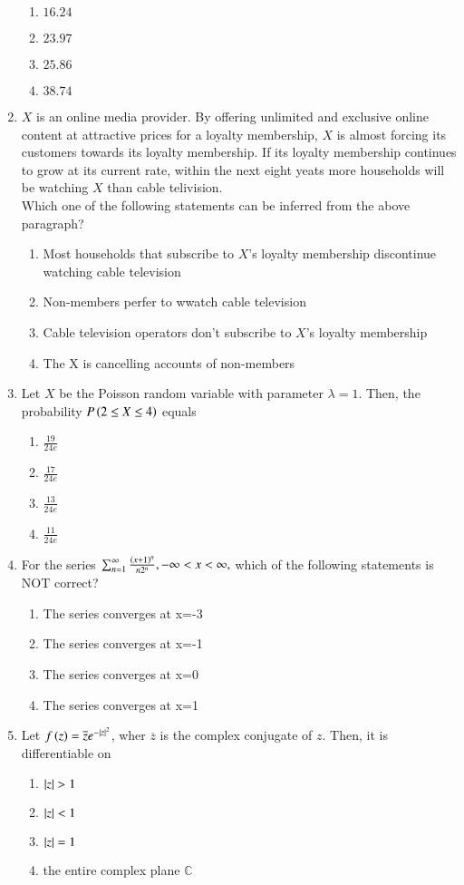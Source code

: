 \documentclass[journal,12pt,onecolumn]{IEEEtran}
\theoremstyle{remark}
\begin{document}
\begin{enumerate}
\begin{enumerate}
	\item $16.24$
	\item $23.97$
	\item $25.86$
	\item $38.74$
\end{enumerate}
\item $X$ is an online media provider. By offering unlimited and exclusive online content at attractive prices for a loyalty membership, $X$ is almost forcing its customers towards its loyalty membership. If its loyalty membership continues to grow at its current rate, within the next eight yeats more households will be watching $X$ than cable telivision.\\ Which one of the following statements can be inferred from the above paragraph?
	\begin{enumerate}
		\item Most households that subscribe to $X$'s loyalty membership discontinue watching cable television
		\item Non-members perfer to wwatch cable television
		\item Cable television operators don't subscribe to $X$'s loyalty membership
		\item The X is cancelling accounts of non-members
	\end{enumerate}
\item Let $X$ be the Poisson random variable with parameter $\lambda=1$. Then, the probability $P\left(2\leq X\leq 4\right)$ equals
	\begin{enumerate}
		\item $\frac{19}{24e}$
		\item $\frac{17}{24e}$
		\item $\frac{13}{24e}$
		\item $\frac{11}{24e}$
\end{enumerate}
\item For the series $\sum_{n=1}^{\infty}\frac{\left(x+1\right)^n}{n 2^n},-\infty<x<\infty,$ which of the following statements is NOT correct?
	\begin{enumerate}
	\item The series converges at x=-3
	\item The series converges at x=-1		  \item The series converges at x=0
	\item The series converges at x=1
\end{enumerate}
\item Let $f\left(z\right)= \overline{z}e^{-\left\vert z\right\vert^2}$, wher $\overline{z}$ is the complex conjugate of $z$. Then, it is differentiable on
	\begin{enumerate}
		\item $\left\vert z\right\vert>1$
		\item $\left\vert z\right\vert<1$
		\item $\left\vert z\right\vert=1$
		\item the entire complex plane $\mathbb{C}$
	\end{enumerate}
\end{enumerate}
\end{document}
